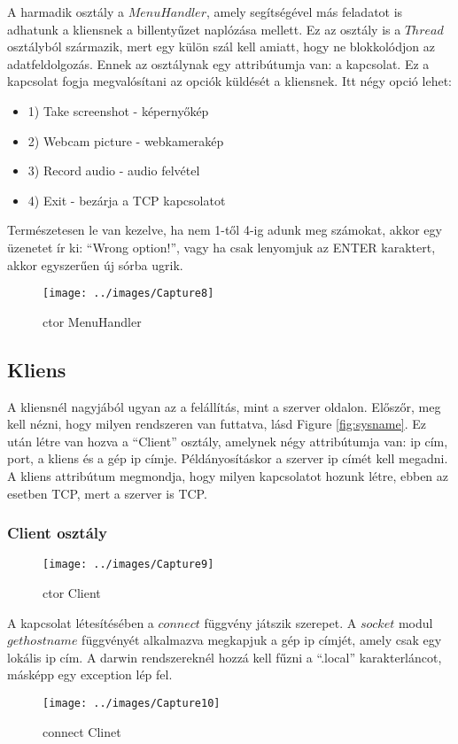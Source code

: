 \documentclass[a4paper, 11pt]{article}
\begin{document}
A harmadik osztály a $MenuHandler$, amely segítségével más feladatot is adhatunk a kliensnek a billentyűzet naplózása mellett. Ez az osztály is a $Thread$ osztályból származik, mert egy külön szál kell amiatt, hogy ne blokkolódjon az adatfeldolgozás. Ennek az osztálynak egy attribútumja van: a kapcsolat. Ez a kapcsolat fogja megvalósítani az opciók küldését a kliensnek. Itt négy opció lehet:
\begin{itemize}
\item 1) Take screenshot - képernyőkép
\item 2) Webcam picture - webkamerakép
\item 3) Record audio - audio felvétel
\item 4) Exit - bezárja a TCP kapcsolatot
\end{itemize}
Természetesen le van kezelve, ha nem 1-től 4-ig adunk meg számokat, akkor egy üzenetet ír ki: ``Wrong option!'', vagy ha csak lenyomjuk az ENTER karaktert, akkor egyszerűen új sórba ugrik.
\begin{figure}[H]
\centering
\texttt{[image: ../images/Capture8]}
\caption{ctor MenuHandler}
\label{fig:ctormenu}
\end{figure}

\subsection{Kliens}\label{subsec:client}
A kliensnél nagyjából ugyan az a felállítás, mint a szerver oldalon. Előszőr, meg kell nézni, hogy milyen rendszeren van futtatva, lásd Figure \ref{fig:sysname}. Ez után létre van hozva a ``Client'' osztály, amelynek négy attribútumja van: ip cím, port, a kliens és a gép ip címje. Példányosításkor a szerver ip címét kell megadni. A kliens attribútum megmondja, hogy milyen kapcsolatot hozunk létre, ebben az esetben TCP, mert a szerver is TCP.
\subsubsection{Client osztály}\label{subsubsec:clinetclass}
\begin{figure}[H]
\centering
\texttt{[image: ../images/Capture9]}
\caption{ctor Client}
\label{ctorclient}
\end{figure}
A kapcsolat létesítésében a $connect$ függvény játszik szerepet. A $socket$ modul $gethostname$ függvényét alkalmazva megkapjuk a gép ip címjét, amely csak egy lokális ip cím. A darwin rendszereknél hozzá kell fűzni a ``.local'' karakterláncot, másképp egy exception lép fel.
\begin{figure}[H]
\centering
\texttt{[image: ../images/Capture10]}
\caption{connect Clinet}
\label{fig:connectclient}
\end{figure}
\end{document}
